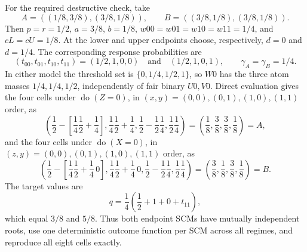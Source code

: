 For the required destructive check, take
\[
A=((1/8,3/8),(3/8,1/8)),
\qquad
B=((3/8,1/8),(3/8,1/8)).
\]
Then \(p=r=1/2\), \(a=3/8\), \(b=1/8\), \(w00=w01=w10=w11=1/4\), and \(cL=cU=1/8\).  At the lower and upper endpoints choose, respectively, \(d=0\) and \(d=1/4\).  The corresponding response probabilities are
\[
(t_{00},t_{01},t_{10},t_{11})=(1/2,1,0,0)
\quad\text{and}\quad
(1/2,1,0,1),
\qquad
\gamma_A=\gamma_B=1/4.
\]
In either model the threshold set is \(\{0,1/4,1/2,1\}\), so \(W0\) has the three atom masses \(1/4,1/4,1/2\), independently of fair binary \(U0,V0\).  Direct evaluation gives the four cells under \(\operatorname{do}(Z=0)\), in \((x,y)=(0,0),(0,1),(1,0),(1,1)\) order, as
\[
\left(\frac12-\left[\frac14\frac12+\frac14\right],
\frac14\frac12+\frac14,
\frac12-\frac12\frac14,
\frac12\frac14\right)
=\left(\frac18,\frac38,\frac38,\frac18\right)=A,
\]
and the four cells under \(\operatorname{do}(X=0)\), in \((z,y)=(0,0),(0,1),(1,0),(1,1)\) order, as
\[
\left(\frac12-\left[\frac14\frac12+\frac14\,0\right],
\frac14\frac12+\frac14\,0,
\frac12-\frac12\frac14,
\frac12\frac14\right)
=\left(\frac38,\frac18,\frac38,\frac18\right)=B.
\]
The target values are
\[
q=\frac14\left(\frac12+1+0+t_{11}\right),
\]
which equal \(3/8\) and \(5/8\).  Thus both endpoint SCMs have mutually independent roots, use one deterministic outcome function per SCM across all regimes, and reproduce all eight cells exactly.
